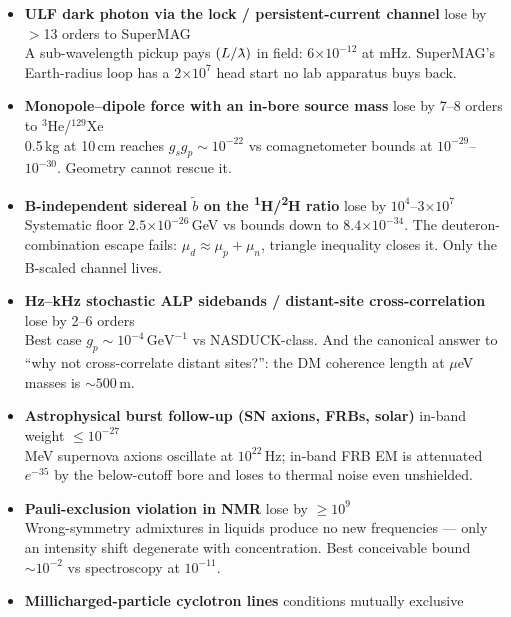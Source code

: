 \documentclass[11pt]{article}
\newcommand{\hnmr}{\textsuperscript{1}H}
\newcommand{\dnmr}{\textsuperscript{2}H}
\newcommand{\ueV}{\ensuremath{\mu}eV}
\newcommand{\e}[1]{\ensuremath{\times10^{#1}}}
\newcommand{\lambdabar}{{\mkern0.75mu\mathchar'26\mkern-9.75mu\lambda}}
\begin{document}
\begin{itemize}[leftmargin=1.2em,itemsep=5pt]
\item \textbf{ULF dark photon via the lock / persistent-current channel}
\hfill \textcolor{killink}{\small lose by $>$13 orders to SuperMAG}\\
{\small A sub-wavelength pickup pays $(L/\lambdabar)$ in field: $6\e{-12}$ at
mHz. SuperMAG's Earth-radius loop has a $2\e{7}$ head start no lab apparatus
buys back.}
\item \textbf{Monopole--dipole force with an in-bore source mass}
\hfill \textcolor{killink}{\small lose by 7--8 orders to $^3$He/$^{129}$Xe}\\
{\small 0.5\,kg at 10\,cm reaches $g_sg_p\sim10^{-22}$ vs comagnetometer bounds
at $10^{-29}$--$10^{-30}$. Geometry cannot rescue it.}
\item \textbf{B-independent sidereal $\tilde b$ on the \hnmr/\dnmr{} ratio}
\hfill \textcolor{killink}{\small lose by $10^{4}$--$3\e{7}$}\\
{\small Systematic floor $2.5\e{-26}$\,GeV vs bounds down to $8.4\e{-34}$. The
deuteron-combination escape fails: $\mu_d\approx\mu_p+\mu_n$, triangle
inequality closes it. Only the B-scaled channel lives.}
\item \textbf{Hz--kHz stochastic ALP sidebands / distant-site cross-correlation}
\hfill \textcolor{killink}{\small lose by 2--6 orders}\\
{\small Best case $g_p\sim10^{-4}\,\mathrm{GeV}^{-1}$ vs NASDUCK-class. And the
canonical answer to ``why not cross-correlate distant sites?'': the DM coherence
length at \ueV{} masses is ${\sim}500$\,m.}
\item \textbf{Astrophysical burst follow-up (SN axions, FRBs, solar)}
\hfill \textcolor{killink}{\small in-band weight $\leq10^{-27}$}\\
{\small MeV supernova axions oscillate at $10^{22}$\,Hz; in-band FRB EM is
attenuated $e^{-35}$ by the below-cutoff bore and loses to thermal noise even
unshielded.}
\item \textbf{Pauli-exclusion violation in NMR}
\hfill \textcolor{killink}{\small lose by $\geq10^{9}$}\\
{\small Wrong-symmetry admixtures in liquids produce no new frequencies ---
only an intensity shift degenerate with concentration. Best conceivable bound
${\sim}10^{-2}$ vs spectroscopy at $10^{-11}$.}
\item \textbf{Millicharged-particle cyclotron lines}
\hfill \textcolor{killink}{\small conditions mutually exclusive}\\

\end{itemize}
\end{document}
